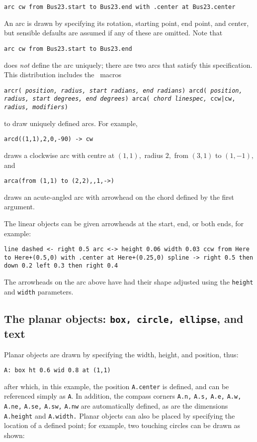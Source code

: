 {\tt arc cw from Bus23.start to Bus23.end with .center at Bus23.center}

An arc is drawn by specifying its rotation, starting point, end point, and
center, but sensible defaults are assumed if any of these are omitted.
Note that

{\tt arc cw from Bus23.start to Bus23.end}

\noindent
does {\em not} define the arc uniquely; there are two arcs that satisfy this
specification.
This distribution includes the \Mfour\ macros

{\tt arcr( {\sl position, radius, start radians, end radians})
\hfill\break\indent
     arcd( {\sl position, radius, start degrees, end degrees})
\hfill\break\indent
     arca( {\sl chord linespec,} ccw|cw, {\sl radius, modifiers})}

\noindent to draw uniquely defined arcs.  For example,

{\tt arcd((1,1),2,0,-90) -> cw}

\noindent draws a clockwise arc with centre at $(1,1),$ radius $2,$
 from $(3,1)$ to $(1,-1),$ and

{\tt arca(from (1,1) to (2,2),,1,->)}

\noindent draws an acute-angled arc with arrowhead on the chord defined by the
first argument.

The linear objects can be given arrowheads at the start, end, or both ends,
for example:

{\tt line dashed <- right 0.5\hfill\break
\hspace*{\parindent}%
arc <-> height 0.06 width 0.03 ccw from Here to Here+(0.5,0)
 \hfill\break
\hspace*{2\parindent}%
   with .center at Here+(0.25,0)\hfill\break
\hspace*{\parindent}%
spline -> right 0.5 then down 0.2 left 0.3 then right 0.4}

The arrowheads on the arc above have had their shape adjusted using the
{\tt height} and {\tt width} parameters.

\subsection{The planar objects: {\tt box, circle, ellipse}, and text}
Planar objects are drawn by specifying the width, height, and position, thus:

{\tt A: box ht 0.6 wid 0.8 at (1,1)}

\noindent
after which, in this example, the position {\tt A.center} is defined,
and can be referenced simply as {\tt A}.  In addition, the
compass corners {\tt A.n,} {\tt A.s,} {\tt A.e,} {\tt A.w,} {\tt A.ne,}
{\tt A.se,} {\tt A.sw,} {\tt A.nw} are automatically defined, as are
the dimensions {\tt A.height} and {\tt A.width.}
Planar objects can also be placed by specifying the location of a defined
point; for example, two touching circles can be drawn as shown:

